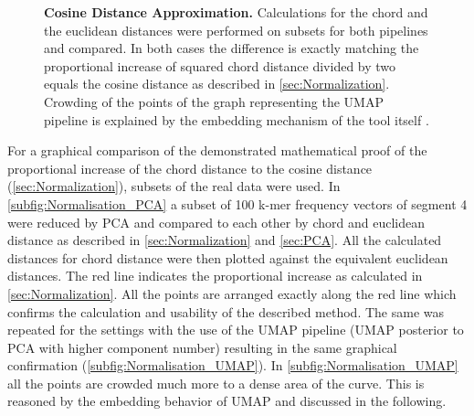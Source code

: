 \begin{figure}[!hbt]
\begin{subfigure}[b]{0.475\textwidth}
    \end{subfigure}
    \caption[Cosine Distance Approximation]{\textbf{Cosine Distance Approximation.} Calculations for the chord and the euclidean distances were performed on subsets for both pipelines and compared. In both cases the difference is exactly matching the proportional increase of squared chord distance divided by two equals the cosine distance as described in \autoref{sec:Normalization}. Crowding of the points of the graph representing the \gls{UMAP} pipeline is explained by the embedding mechanism of the tool itself \autocite{mcinnes_umap_2020}.}
    \label{fig:Normalisation_Methods}
\end{figure}

For a graphical comparison of the demonstrated mathematical proof of the proportional increase of the chord distance to the cosine distance (\autoref{sec:Normalization}), subsets of the real data were used. In \autoref{subfig:Normalisation_PCA} a subset of 100 k-mer frequency vectors of segment 4 were reduced by \gls{PCA} and compared to each other by chord and euclidean distance as described in \autoref{sec:Normalization} and \autoref{sec:PCA}. All the calculated distances for chord distance were then plotted against the equivalent euclidean distances. The red line indicates the proportional increase as calculated in \autoref{sec:Normalization}. All the points are arranged exactly along the red line which confirms the calculation and usability of the described method. The same was repeated for the settings with the use of the \gls{UMAP} pipeline (\gls{UMAP} posterior to \gls{PCA} with higher component number) resulting in the same graphical confirmation (\autoref{subfig:Normalisation_UMAP}). In \autoref{subfig:Normalisation_UMAP} all the points are crowded much more to a dense area of the curve. This is reasoned by the embedding behavior of \gls{UMAP} and discussed in the following.











